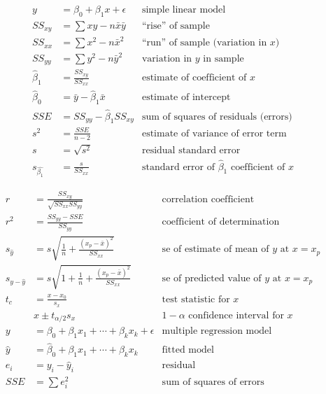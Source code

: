 \documentclass[12pt, landscape]{article}
\begin{document}
\begin{multicols}{2}
\setlength{\abovedisplayskip}{0pt}
\setlength{\belowdisplayskip}{0pt}
\setlength{\abovedisplayshortskip}{0pt}
\setlength{\belowdisplayshortskip}{0pt}
\begin{align*}
    y &= \beta_0 + \beta_1 x + \epsilon &\text{simple linear model} \\
    SS_{xy} &= \sum{xy} - n \bar{x} \bar{y} &\text{“rise” of sample}\\
    SS_{xx} &= \sum{x^2} - n \bar{x}^2 &\text{“run” of sample (variation in }x\text{)} \\
    SS_{yy} &= \sum{y^2} - n \bar{y}^2 &\text{variation in }y\text{ in sample} \\
    \hat{\beta}_1 &= \frac{SS_{xy}}{SS_{xx}}&\text{estimate of coefficient of }x \\
    \hat{\beta}_0 &= \bar{y} - \hat{\beta}_1 \bar{x} &\text{estimate of intercept} \\
    SSE &= SS_{yy} - \hat{\beta}_1 SS_{xy} &\text{sum of squares of residuals (errors)}\\
    s^2 &= \frac{SSE}{n-2} & \text{estimate of variance of error term}\\
    s &= \sqrt{s^2} &\text{residual standard error} \\
    s_{\hat{\beta_1}} &= \frac{s}{SS_{xx}} &\text{standard error of } \hat{\beta}_1 \text{ coefficient of }x
\end{align*}

\vfill\null
\columnbreak

\begin{align*}
    r &= \frac{SS_{xy}}{\sqrt{SS_{xx} SS_{yy}}} & \text{correlation coefficient}\\
    r^2 &= \frac{SS_{yy} - SSE}{SS_{yy}} & \text{coefficient of determination}\\
    s_{\hat{y}} &= s \sqrt{\frac{1}{n} + \frac{(x_p - \bar{x})^2}{SS_{xx}}} & \text{se of estimate of mean of } y \text{ at } x = x_p\\
    s_{y-\hat{y}} &= s \sqrt{1 + \frac{1}{n} + \frac{(x_p - \bar{x})^2}{SS_{xx}}} & \text{se of predicted value of } y \text{ at } x = x_p\\
    t_c &= \frac{x - x_0}{s_x} & \text{test statistic for } x\\
    &x \pm t_{\alpha / 2} s_x & 1-\alpha \text{ confidence interval for } x\\
    y &= \beta_0 + \beta_1 x_1 + \dotsm + \beta_k x_k + \epsilon &\text{multiple regression model} \\
    \hat{y} &= \hat{\beta}_0 + \beta_1 x_1 + \dotsm + \beta_k x_k &\text{fitted model} \\
    e_i &= y_i - \hat{y}_i &\text{residual} \\
    SSE &= \sum{e_i^2} &\text{sum of squares of errors}
\end{align*}


\end{multicols}
\end{document}
